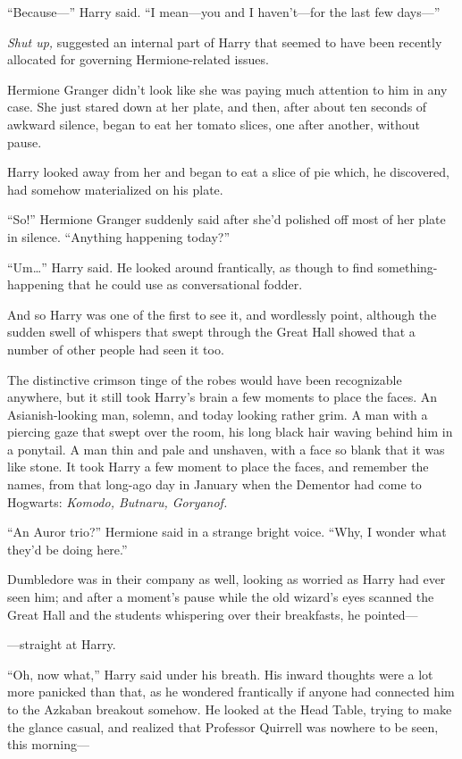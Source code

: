 “Because—” Harry said. “I mean—you and I haven’t—for the last few days—”

\emph{Shut up,} suggested an internal part of Harry that seemed to have been recently allocated for governing Hermione-related issues.

Hermione Granger didn’t look like she was paying much attention to him in any case. She just stared down at her plate, and then, after about ten seconds of awkward silence, began to eat her tomato slices, one after another, without pause.

Harry looked away from her and began to eat a slice of pie which, he discovered, had somehow materialized on his plate.

“So!” Hermione Granger suddenly said after she’d polished off most of her plate in silence. “Anything happening today?”

“Um…” Harry said. He looked around frantically, as though to find something-happening that he could use as conversational fodder.

And so Harry was one of the first to see it, and wordlessly point, although the sudden swell of whispers that swept through the Great Hall showed that a number of other people had seen it too.

The distinctive crimson tinge of the robes would have been recognizable anywhere, but it still took Harry’s brain a few moments to place the faces. An Asianish-looking man, solemn, and today looking rather grim. A man with a piercing gaze that swept over the room, his long black hair waving behind him in a ponytail. A man thin and pale and unshaven, with a face so blank that it was like stone. It took Harry a few moment to place the faces, and remember the names, from that long-ago day in January when the Dementor had come to Hogwarts: \emph{Komodo, Butnaru, Goryanof.}

“An Auror trio?” Hermione said in a strange bright voice. “Why, I wonder what they’d be doing here.”

Dumbledore was in their company as well, looking as worried as Harry had ever seen him; and after a moment’s pause while the old wizard’s eyes scanned the Great Hall and the students whispering over their breakfasts, he pointed—

—straight at Harry.

“Oh, now what,” Harry said under his breath. His inward thoughts were a lot more panicked than that, as he wondered frantically if anyone had connected him to the Azkaban breakout somehow. He looked at the Head Table, trying to make the glance casual, and realized that Professor Quirrell was nowhere to be seen, this morning—

